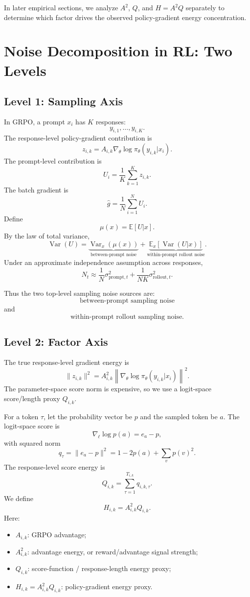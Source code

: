 \documentclass[11pt,a4paper]{article}
\newcommand{\E}{\mathbb{E}}
\newcommand{\Var}{\operatorname{Var}}
\begin{document}
In later empirical sections, we analyze \(A^2\), \(Q\), and \(H=A^2Q\) separately to determine which factor drives the observed policy-gradient energy concentration.


\section{Noise Decomposition in RL: Two Levels}

\subsection{Level 1: Sampling Axis}

In GRPO, a prompt \(x_i\) has \(K\) responses:
\[
y_{i,1},\ldots,y_{i,K}.
\]
The response-level policy-gradient contribution is
\[
z_{i,k}=A_{i,k}\nabla_\theta \log \pi_\theta(y_{i,k}|x_i).
\]
The prompt-level contribution is
\[
U_i=\frac{1}{K}\sum_{k=1}^K z_{i,k}.
\]
The batch gradient is
\[
\hat g=\frac{1}{N}\sum_{i=1}^N U_i.
\]
Define
\[
\mu(x)=\E[U|x].
\]
By the law of total variance,
\[
\Var(U)
=
\underbrace{\Var_x(\mu(x))}_{\text{between-prompt noise}}
+
\underbrace{\E_x[\Var(U|x)]}_{\text{within-prompt rollout noise}}.
\]
Under an approximate independence assumption across responses,
\[
N_t
\approx
\frac{1}{N}\sigma^2_{\mathrm{prompt},t}
+
\frac{1}{NK}\sigma^2_{\mathrm{rollout},t}.
\]

Thus the two top-level sampling noise sources are:
\[
\boxed{\text{between-prompt sampling noise}}
\]
and
\[
\boxed{\text{within-prompt rollout sampling noise}}.
\]

\subsection{Level 2: Factor Axis}

The true response-level gradient energy is
\[
\|z_{i,k}\|^2
=
A_{i,k}^2
\left\|
\nabla_\theta\log\pi_\theta(y_{i,k}|x_i)
\right\|^2.
\]
The parameter-space score norm is expensive, so we use a logit-space score/length proxy \(Q_{i,k}\).

For a token \(\tau\), let the probability vector be \(p\) and the sampled token be \(a\). The logit-space score is
\[
\nabla_\ell \log p(a)=e_a-p,
\]
with squared norm
\[
q_\tau
=
\|e_a-p\|^2
=
1-2p(a)+\sum_v p(v)^2.
\]
The response-level score energy is
\[
Q_{i,k}=\sum_{\tau=1}^{T_{i,k}} q_{i,k,\tau}.
\]
We define
\[
\boxed{
H_{i,k}=A_{i,k}^2Q_{i,k}.
}
\]
Here:
\begin{itemize}[leftmargin=2em]
    \item \(A_{i,k}\): GRPO advantage;
    \item \(A_{i,k}^2\): advantage energy, or reward/advantage signal strength;
    \item \(Q_{i,k}\): score-function / response-length energy proxy;
    \item \(H_{i,k}=A_{i,k}^2Q_{i,k}\): policy-gradient energy proxy.
\end{itemize}
\end{document}
